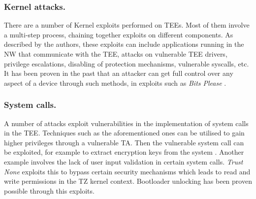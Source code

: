 \documentclass[runningheads,a4paper]{uwsese}
\begin{document}
\subsubsection{Kernel attacks.}

There are a number of Kernel exploits performed on \glspl{TEE}. Most of them
involve a multi-step process, chaining together exploits on different
components. As described by the authors, these exploits can include
applications running in the \gls{NW} that communicate with the \gls{TEE},
attacks on vulnerable \gls{TEE} drivers, privilege escalations, disabling of
protection mechanisms, vulnerable syscalls, etc. It has been proven in the past
that an attacker can get full control over any aspect of a device through such
methods, in exploits such as \emph{Bits Please} \cite{bits_please}. 

\subsubsection{System calls.}

A number of attacks exploit vulnerabilities in the implementation of system
calls in the \gls{TEE}. Techniques such as the aforementioned ones can be utilised
to gain higher privileges through a vulnerable \gls{TA}. Then the
vulnerable system call can be exploited, for example to extract encryption keys
from the system \cite{bits_fde}. Another example involves the lack of user
input validation in certain system calls. \emph{Trust None} \cite{trust_none}
exploits this to bypass certain security mechanisms which leads to read and write
permissions in the \gls{TZ} kernel context. Bootloader unlocking has been proven 
possible through this exploits.



\end{document}
